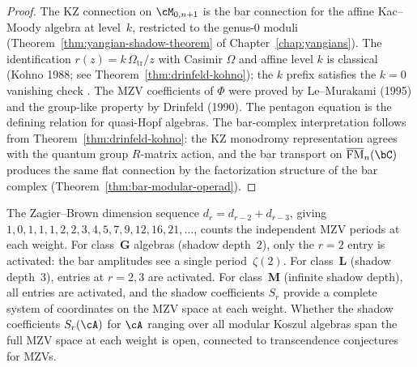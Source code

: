 \begin{proof}
The KZ connection on $\cM_{0,n+1}$ is the bar connection
for the affine Kac--Moody algebra at level~$k$, restricted
to the genus-$0$ moduli
(Theorem~\ref{thm:yangian-shadow-theorem} of
Chapter~\ref{chap:yangians}).
The identification $r(z) = k\,\Omega_{\mathrm{tr}}/z$ with Casimir
$\Omega$ and affine level $k$ is classical (Kohno 1988;
see Theorem~\ref{thm:drinfeld-kohno}); the $k$ prefix
satisfies the $k = 0$ vanishing check .
The MZV coefficients of $\Phi$ were proved by
Le--Murakami (1995) and the group-like property
by Drinfeld (1990). The pentagon equation is the
defining relation for quasi-Hopf algebras.
The bar-complex interpretation follows from
Theorem~\ref{thm:drinfeld-kohno}: the KZ
monodromy representation agrees with the quantum
group $R$-matrix action, and the bar transport on
$\overline{\mathrm{FM}}_n(\bC)$ produces the same
flat connection by the factorization structure of
the bar complex
(Theorem~\ref{thm:bar-modular-operad}).
\end{proof}

\begin{remark}%
\label{rem:zagier-dimension-shadow}%
%
%
The Zagier--Brown dimension sequence
$d_r = d_{r-2} + d_{r-3}$, giving
$1, 0, 1, 1, 1, 2, 2, 3, 4, 5, 7, 9, 12, 16, 21, \ldots$,
counts the independent MZV periods at each weight.
For class~$\mathbf{G}$ algebras (shadow depth~$2$), only
the $r = 2$ entry is activated: the bar amplitudes see
a single period~$\zeta(2)$.
For class~$\mathbf{L}$ (shadow depth~$3$), entries at $r = 2, 3$
are activated.
For class~$\mathbf{M}$ (infinite shadow depth), all entries
are activated, and the shadow coefficients
$S_r$ provide a complete system of coordinates on
the MZV space at each weight. Whether the shadow
coefficients $S_r(\cA)$ for $\cA$ ranging over all
modular Koszul algebras span the full MZV space at
each weight is open, connected to
transcendence conjectures for MZVs.
\end{remark}

